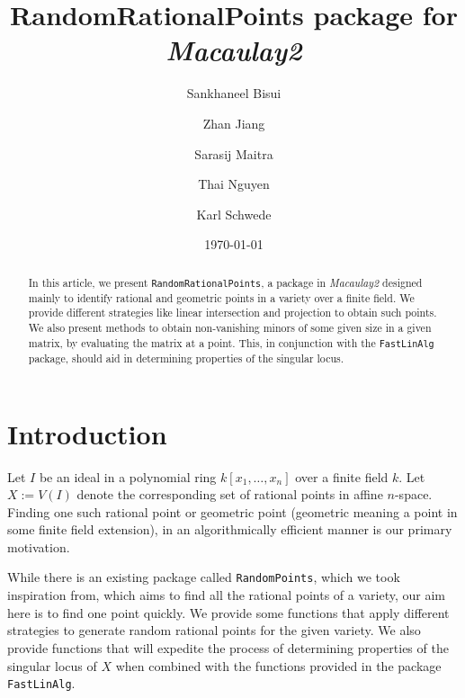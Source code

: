 \documentclass[11pt]{amsart}
\theoremstyle{definition}
\begin{document}
\title{{RandomRationalPoints} package for \emph{Macaulay2}}
\author{Sankhaneel Bisui}
\address{Tulane University}
\author{Zhan Jiang}
\address{University of Michigan}
\author{Sarasij Maitra}
\address{University of Virginia}
\author{Thai Nguyen}
\address{Tulane University}
\author{Karl Schwede}
\address{Department of Mathematics, University of Utah, 155 S 1400 E Room 233, Salt Lake City, UT, 84112}
\date{\today}

\begin{abstract}
In this article, we present {\tt RandomRationalPoints}, a package in \emph{Macaulay2} designed mainly to identify rational and geometric points in a variety over a finite field. We provide different strategies like linear intersection and projection to obtain such points. We also present methods to obtain non-vanishing minors of some given size in a given matrix, by evaluating the matrix at a point.  This, in conjunction with the {\tt FastLinAlg} package, should aid in determining properties of the singular locus.
\end{abstract}

 

\maketitle

\section{Introduction}
 Let $I$ be an ideal in a polynomial ring $k[x_1,\dots, x_n]$ over a finite field $k$. Let $X:=V(I)$ denote the corresponding set of rational points in affine $n$-space. Finding one such rational point or geometric point (geometric meaning a point in some finite field extension), in an algorithmically efficient manner is our primary motivation. 
 
 While there is an existing package called {\tt RandomPoints}, which we took inspiration from, which aims to find all the rational points of a variety, our aim here is to find one point quickly.
 We provide some functions that apply different strategies to generate random rational points for the given variety. We also provide functions that will expedite the process of determining properties of the singular locus of $X$ when combined with the functions provided in the package {\tt FastLinAlg}.  
 
\end{document}
